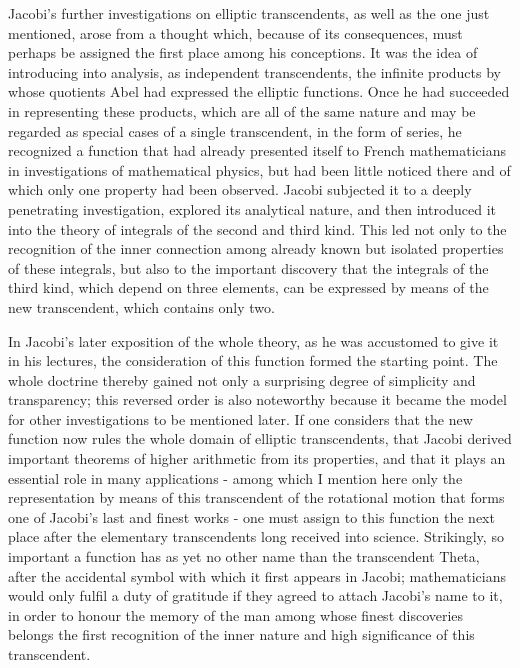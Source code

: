 \documentclass[11pt]{article}
\begin{document}
Jacobi's further investigations on elliptic transcendents, as well as the one just mentioned, arose from a thought which, because of its consequences, must perhaps be assigned the first place among his conceptions. It was the idea of introducing into analysis, as independent transcendents, the infinite products by whose quotients Abel had expressed the elliptic functions. Once he had succeeded in representing these products, which are all of the same nature and may be regarded as special cases of a single transcendent, in the form of series, he recognized a function that had already presented itself to French mathematicians in investigations of mathematical physics, but had been little noticed there and of which only one property had been observed. Jacobi subjected it to a deeply penetrating investigation, explored its analytical nature, and then introduced it into the theory of integrals of the second and third kind. This led not only to the recognition of the inner connection among already known but isolated properties of these integrals, but also to the important discovery that the integrals of the third kind, which depend on three elements, can be expressed by means of the new transcendent, which contains only two.

In Jacobi's later exposition of the whole theory, as he was accustomed to give it in his lectures, the consideration of this function formed the starting point. The whole doctrine thereby gained not only a surprising degree of simplicity and transparency; this reversed order is also noteworthy because it became the model for other investigations to be mentioned later. If one considers that the new function now rules the whole domain of elliptic transcendents, that Jacobi derived important theorems of higher arithmetic from its properties, and that it plays an essential role in many applications - among which I mention here only the representation by means of this transcendent of the rotational motion that forms one of Jacobi's last and finest works - one must assign to this function the next place after the elementary transcendents long received into science. Strikingly, so important a function has as yet no other name than the transcendent Theta, after the accidental symbol with which it first appears in Jacobi; mathematicians would only fulfil a duty of gratitude if they agreed to attach Jacobi's name to it, in order to honour the memory of the man among whose finest discoveries belongs the first recognition of the inner nature and high significance of this transcendent.
\end{document}
